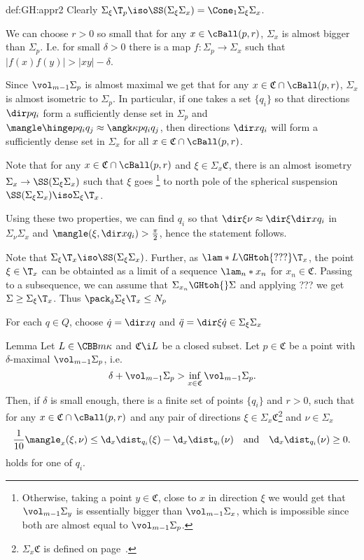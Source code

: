 {\begin{subthm}{def:GH:appr2}
Clearly $\Sigma_\xi\T_p\iso\SS(\Sigma_\xi\Sigma_x)=\Cone_1\Sigma_\xi\Sigma_x$.


We can choose $ r>0$ so small that for any $x\in \cBall(p, r)$, 
$\Sigma_x$ is almost bigger than $\Sigma_p$.
I.e. for small $\delta>0$ there is a map $f:\Sigma_p\to \Sigma_x$ such that $|f(x)f(y)|>|x y|-\delta$. 

Since $\vol_{m-1} \Sigma_p$ is almost maximal we get that for any 
$x\in  \mathfrak C\cap \cBall(p, r)$, $\Sigma_x$ is almost isometric to $\Sigma_p$.
In particular, if one takes a set $\{q_i\}$ so that directions $\dir p {q_i}$
form a sufficiently dense set in $\Sigma_p$ and 
$\mangle\hinge p{q_i}{q_j}\approx\angk\kappa p{q_i}{q_j}$, 
then directions $\dir x{q_i}$ will form a sufficiently dense set in
$\Sigma_x$ for all $x\in\mathfrak C\cap \cBall(p, r)$.

Note that for any $x\in  \mathfrak C\cap \cBall(p, r)$ and $\xi\in
\Sigma_x\mathfrak C$,  there is an almost isometry $\Sigma_x\to \SS(\Sigma_\xi \Sigma_x)$ such
that $\xi$ goes%
\footnote{Otherwise, taking a point $y\in \mathfrak C$, close to $x$ in direction
$\xi$ we would get that $\vol_{m-1}\Sigma_y$ is essentially bigger than
$\vol_{m-1}\Sigma_x$, which is impossible since both are almost equal to
$\vol_{m-1}\Sigma_p$.} 
to north pole of the spherical suspension 
$\SS(\Sigma_\xi \Sigma_x)\iso\Sigma_\xi\T_x$.

Using these two properties, we can find $q_i$ so that 
$\dir\xi\nu\approx\dir \xi{\dir x{q_i}}$ in $\Sigma_\nu \Sigma_x$ and
$\mangle(\xi,\dir x{q_i})>\tfrac\pi2$, hence the statement follows.

Note that 
$\Sigma_\xi\T_x\iso\SS(\Sigma_\xi\Sigma_x)$.
Further, as $\lam*L\GHtoh{???}\T_x$,
the point $\xi\in \T_x$ can be obtainted as a limit of a sequence $\lam_n*x_n$ for $x_n\in\mathfrak C$.
Passing to a subsequence, we can assume that $\Sigma_{x_n}\GHtoh{} \Sigma$ and applying ??? we get $\Sigma\ge \Sigma_\xi\T_x$.
Thus $\pack_\delta\Sigma_\xi\T_x\le N_p$

For each $q\in Q$, 
choose $\dot q=\dir xq$ 
and $\ddot q=\dir \xi {\dot q}\in \Sigma_\xi\Sigma_x$

\qeds


\begin{thm}{Lemma}
Let $L\in\CBB m \kappa$ and $\mathfrak C\i L$ be a closed subset.
Let $p\in \mathfrak C$ be a point with  $\delta$-maximal $\vol_{m-1} \Sigma_p$, i.e.
$$\delta+\vol_{m-1} \Sigma_p>\inf_{x\in\mathfrak C} \vol_{m-1} \Sigma_p.$$ 
Then, if $\delta$ is small enough, there is a finite set of points $\{q_i\}$ and
$ r>0$, such that for any $x\in\mathfrak C\cap \cBall(p, r)$ and any pair of directions $\xi\in \Sigma_x\mathfrak C$\footnote{$\Sigma_x\mathfrak C$ is defined on page~\pageref{U_pX}.} and $\nu\in
\Sigma_x$
$$\frac{1}{10}\mangle_x(\xi,\nu)\le \d_x\dist_{q_i}(\xi)-\d_x\dist_{q_i}(\nu)\ \ \
\text{and}\ \ \ \d_x\dist_{q_i}(\nu)\ge0.$$
holds for one of $q_i$. 
\end{thm}


\end{subthm}}
